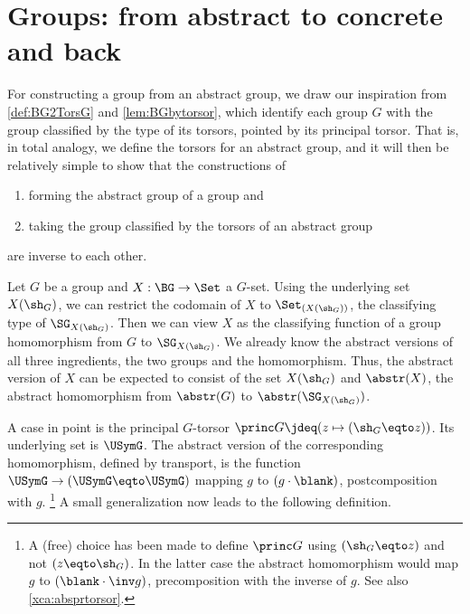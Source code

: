 \section{Groups: from abstract to concrete and back}
\label{sec:Gsetforabstract}

For constructing a group from an abstract group, we draw our inspiration
from \cref{def:BG2TorsG} and \cref{lem:BGbytorsor},
which identify each group $G$ with the group classified by
the type of its torsors, pointed by its principal torsor.
That is, in total analogy, we define the torsors for an abstract group,
and it will then be relatively simple to show that the constructions of
\begin{enumerate}
\item forming the abstract group of a group and
\item taking the group classified by the torsors of an abstract group
\end{enumerate}
 are inverse to each other.

Let $G$ be a group and $X:\BG\to\Set$ a $G$-set. Using the
underlying set $X(\sh_G)$, we can restrict the
codomain of $X$ to $\Set_{(X(\sh_G))}$, the classifying type of 
$\SG_{X(\sh_G)}$. Then we can view $X$ as the classifying function of 
a group homomorphism from $G$ to $\SG_{X(\sh_G)}$.
We already know the abstract versions of all three ingredients,
the two groups and the homomorphism. Thus, the abstract version
of $X$ can be expected to consist of the set $X(\sh_G)$ and 
$\abstr(X)$, the abstract homomorphism from $\abstr(G)$ 
to $\abstr(\SG_{X(\sh_G)})$.

A case in point is the principal $G$-torsor $\princ G \jdeq
(z\mapsto (\sh_G\eqto z))$. Its underlying set is $\USymG$.
The abstract version of the corresponding homomorphism,
defined by transport, is the function $\USymG\to(\USymG\eqto\USymG)$
mapping $g$ to $(g\cdot\blank)$, \ie postcomposition with $g$.%
\footnote{\label{ft:choicePshG}A (free) choice has been made to define 
$\princ G$ using $(\sh_G\eqto z)$ and not $(z\eqto\sh_G)$. In the latter
case the abstract homomorphism would map $g$ to $(\blank\cdot\inv g)$, \ie
precomposition with the inverse of $g$. See also \cref{xca:absprtorsor}.}
A small generalization now leads to the following definition.

